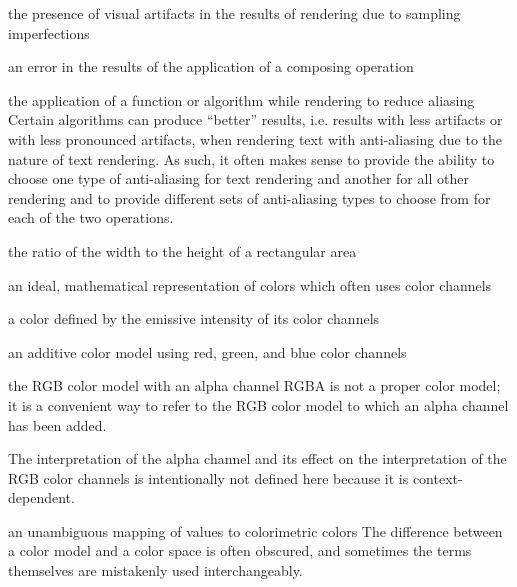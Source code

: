 the presence of visual artifacts in the results of rendering due to 
sampling imperfections

an error in the results of the application of a composing operation 

the application of a function or algorithm while rendering to 
reduce aliasing
\enternote
Certain algorithms can produce ``better'' results, i.e. results with less 
artifacts or with less pronounced artifacts, when rendering text with 
anti-aliasing due to the nature of text rendering. As such, it often makes 
sense to provide the ability to choose one type of anti-aliasing for text 
rendering and another for all other rendering and to provide different sets of 
anti-aliasing types to choose from for each of the two operations.
\exitnote

the ratio of the width to the height of a rectangular area

an ideal, mathematical representation of colors which often uses color channels

a color defined by the emissive intensity of its color channels

an additive color model using red, green, and blue color channels

the RGB color model with an alpha channel
\enternote
RGBA is not a proper color model; it is a convenient way to refer to the RGB color model to which an alpha channel has been added.

The interpretation of the alpha channel and its effect on the interpretation of the RGB color channels is intentionally not defined here because it is context-dependent.
\exitnote

an unambiguous mapping of values to colorimetric colors
\enternote
The difference between a color model and a color space is often obscured, and sometimes the terms themselves are mistakenly used interchangeably.

